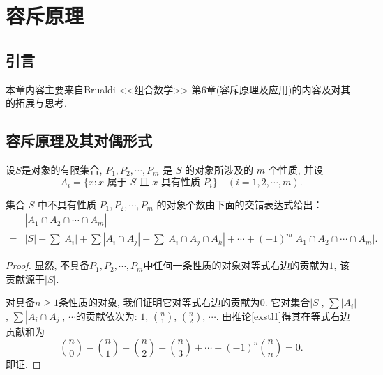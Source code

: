 \chapter{容斥原理}
\section*{引言}
本章内容主要来自Brualdi <<组合数学>> 第6章(容斥原理及应用)的内容及对其的拓展与思考.

\section{容斥原理及其对偶形式}
设$S$是对象的有限集合, $P_1, P_2, \cdots, P_m$ 是 $S$ 的对象所涉及的 $m$ 个性质, 并设
\[ A_i = \{ x : x \text{ 属于 } S \text{ 且 } x \text{ 具有性质 } P_i \} \quad (i = 1, 2, \cdots, m). \]

\begin{theorem}[容斥原理的对偶形式]
    集合 $S$ 中不具有性质 $P_1, P_2, \cdots, P_m$ 的对象个数由下面的交错表达式给出：
    \begin{align*}
          & |\overline{A}_1 \cap \overline{A}_2 \cap \cdots \cap \overline{A}_m|                                                         \\
        = & |S| - \sum |A_i| + \sum |A_i \cap A_j| - \sum |A_i \cap A_j \cap A_k| + \cdots + (-1)^m |A_1 \cap A_2 \cap \cdots \cap A_m|.
    \end{align*}
\end{theorem}

\begin{proof}
    显然, 不具备$P_1, P_2, \cdots, P_m$中任何一条性质的对象对等式右边的贡献为$1$, 该贡献源于$|S|$.

    对具备$n\geq 1$条性质的对象, 我们证明它对等式右边的贡献为$0$. 它对集合$|S|$, $\sum |A_i|$, $\sum |A_i \cap A_j|$, $\cdots$的贡献依次为: $1$, $\binom{n}{1}$, $\binom{n}{2}$, $\cdots$. 由推论\ref{exstl1}得其在等式右边贡献和为
    $$\binom{n}{0} - \binom{n}{1} + \binom{n}{2} - \binom{n}{3} + \cdots + (-1)^n \binom{n}{n}=0.$$
    即证.
\end{proof}

